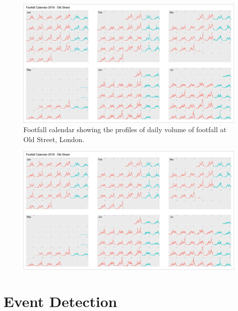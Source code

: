 \cleartoleftpage
{}
\begin{figure}
  \forceversofloat
  \includegraphics[width=172mm,trim={0 0 1310 -42},clip]{images/applications-footfall-calendar.png}
  \caption{Footfall calendar showing the profiles of daily volume of footfall at Old Street, London.}
  \label{}
\end{figure}
\clearpage
\begin{figure}
  \forcerectofloat
  \includegraphics[width=172mm,trim={1315 0 0 0},clip]{images/applications-footfall-calendar.png}
  \caption[]{}
  \label{}
\end{figure}
\restoregeometry
\clearpage

\lipsum[1-2]

\section{Event Detection}

